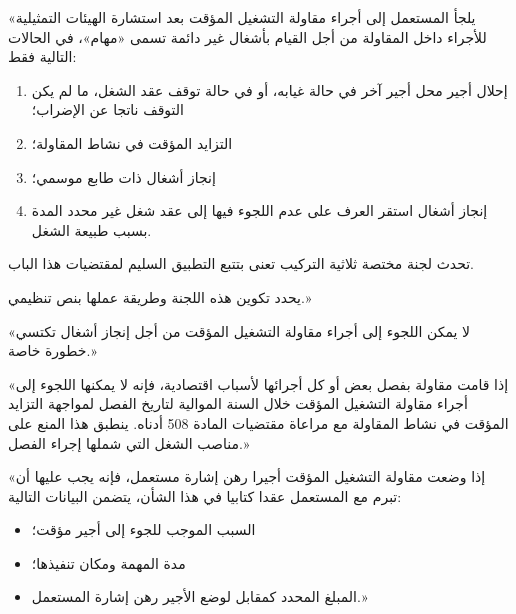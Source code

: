 \begin{tcolorbox}[colback=lightgray, colframe=sectioncolor, arc=3pt, title={\textbf{المادة 496}}]
«يلجأ المستعمل إلى أجراء مقاولة التشغيل المؤقت بعد استشارة الهيئات التمثيلية للأجراء داخل المقاولة من أجل القيام بأشغال غير دائمة تسمى «مهام»، في الحالات التالية فقط:
\begin{enumerate}[itemsep=2pt]
    \item إحلال أجير محل أجير آخر في حالة غيابه، أو في حالة توقف عقد الشغل، ما لم يكن التوقف ناتجا عن الإضراب؛
    \item التزايد المؤقت في نشاط المقاولة؛
    \item إنجاز أشغال ذات طابع موسمي؛
    \item إنجاز أشغال استقر العرف على عدم اللجوء فيها إلى عقد شغل غير محدد المدة بسبب طبيعة الشغل.
\end{enumerate}
تحدث لجنة مختصة ثلاثية التركيب تعنى بتتبع التطبيق السليم لمقتضيات هذا الباب.

يحدد تكوين هذه اللجنة وطريقة عملها بنص تنظيمي.»
\end{tcolorbox}

\begin{tcolorbox}[colback=lightgray, colframe=sectioncolor, arc=3pt, title={\textbf{المادة 497}}]
«لا يمكن اللجوء إلى أجراء مقاولة التشغيل المؤقت من أجل إنجاز أشغال تكتسي خطورة خاصة.»
\end{tcolorbox}

\begin{tcolorbox}[colback=lightgray, colframe=sectioncolor, arc=3pt, title={\textbf{المادة 498}}]
«إذا قامت مقاولة بفصل بعض أو كل أجرائها لأسباب اقتصادية، فإنه لا يمكنها اللجوء إلى أجراء مقاولة التشغيل المؤقت خلال السنة الموالية لتاريخ الفصل لمواجهة التزايد المؤقت في نشاط المقاولة مع مراعاة مقتضيات المادة \textenglish{508} أدناه. ينطبق هذا المنع على مناصب الشغل التي شملها إجراء الفصل.»
\end{tcolorbox}

\begin{tcolorbox}[colback=lightgray, colframe=sectioncolor, arc=3pt, title={\textbf{المادة 499}}]
«إذا وضعت مقاولة التشغيل المؤقت أجيرا رهن إشارة مستعمل، فإنه يجب عليها أن تبرم مع المستعمل عقدا كتابيا في هذا الشأن، يتضمن البيانات التالية:
\begin{itemize}[itemsep=2pt]
    \item السبب الموجب للجوء إلى أجير مؤقت؛
    \item مدة المهمة ومكان تنفيذها؛
    \item المبلغ المحدد كمقابل لوضع الأجير رهن إشارة المستعمل.»
\end{itemize}
\end{tcolorbox}

